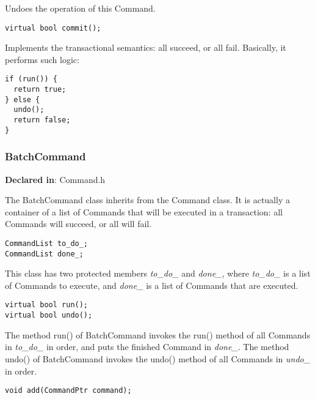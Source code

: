 Undoes the operation of this Command.


\begin{verbatim}
virtual bool commit();

\end{verbatim}



Implements the transactional semantics: all succeed, or all fail. Basically, it
performs such logic:

\begin{verbatim}
if (run()) {
  return true;
} else {
  undo();
  return false;
}

\end{verbatim}



\subsubsection{BatchCommand}
\label{sec-3.2.4}

\textbf{Declared in}: Command.h

The BatchCommand class inherits from the Command class. It is actually a
container of a list of Commands that will be executed in a transaction: all
Commands will succeed, or all will fail.


\begin{verbatim}
CommandList to_do_;
CommandList done_;

\end{verbatim}



This class has two protected members \emph{to\_do\_} and \emph{done\_}, where \emph{to\_do\_}
is a list of Commands to execute, and \emph{done\_} is a list of Commands that are
executed.


\begin{verbatim}
virtual bool run();
virtual bool undo();

\end{verbatim}



The method run() of BatchCommand invokes the run() method of all Commands in
\emph{to\_do\_} in order, and puts the finished Command in \emph{done\_}. The method
undo() of BatchCommand invokes the undo() method of all Commands in \emph{undo\_} in
order.


\begin{verbatim}
void add(CommandPtr command);

\end{verbatim}



